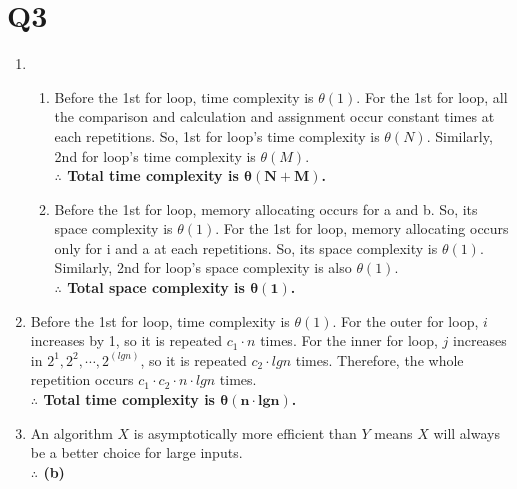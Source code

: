 \documentclass[12pt,a4paper]{article}
\begin{document}
\section{Q3}
\begin{enumerate}[label=(\arabic*)]
    \item
        \begin{enumerate}
            \item
                Before the 1st for loop, time complexity is $\theta(1)$.
                For the 1st for loop, all the comparison and calculation and assignment occur constant times at each repetitions.
                So, 1st for loop's time complexity is $\theta(N)$.
                Similarly, 2nd for loop's time complexity is $\theta(M)$.\\
                \textbf{$\therefore$ Total time complexity is $\mathbf{\theta(N+M)}$.}
            \item
                Before the 1st for loop, memory allocating occurs for a and b. So, its space complexity is $\theta(1)$.
                For the 1st for loop, memory allocating occurs only for i and a at each repetitions. So, its space complexity is $\theta(1)$.
                Similarly, 2nd for loop's space complexity is also $\theta(1)$.\\
                \textbf{$\therefore$ Total space complexity is $\mathbf{\theta(1)}$.}
        \end{enumerate}
    \item
        Before the 1st for loop, time complexity is $\theta(1)$.
        For the outer for loop, $i$ increases by 1, so it is repeated $c_1\cdot n$ times.
        For the inner for loop, $j$ increases in $2^1, 2^2, \cdots, 2^(lgn)$, so it is repeated $c_2\cdot lgn$ times.
        Therefore, the whole repetition occurs $c_1\cdot c_2\cdot n\cdot lgn$ times.\\
        \textbf{$\therefore$ Total time complexity is $\mathbf{\theta(n\cdot lgn)}$.}

    \item
        An algorithm $X$ is asymptotically more efficient than $Y$ means $X$ will always be a better choice for large inputs.\\
        \textbf{$\therefore$ (b)}

\end{enumerate}
\end{document}
